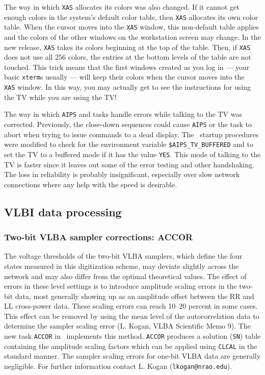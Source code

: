The way in which {\tt XAS} allocates its colors was also changed.  If
it cannot get enough colors in the system's default color table, then
{\tt XAS} allocates its own color table.  When the cursor moves into
the {\tt XAS} window, this non-default table applies and the colors of
the other windows on the workstation screen may change.  In the new
release, {\tt XAS} takes its colors beginning at the top of the table.
Then, if {\tt XAS} does not use all 256 colors, the entries at the
bottom levels of the table are not touched.  This trick means that the
first windows created as you log in --- your basic {\tt xterm}s
usually --- will keep their colors when the cursor moves into the {\tt
XAS} window.  In this way, you may actually get to see the
instructions for using the TV while you are using the \hbox{TV}!

\vfill\eject
The way in which {\tt AIPS} and tasks handle errors while talking to
the TV was corrected.  Previously, the close-down sequences could
cause {\tt AIPS} or the task to abort when trying to issue commands to
a dead display.  The \AIPS\ startup procedures were modified to check
for the environment variable {\tt \$AIPS\_TV\_BUFFERED} and to set the
TV to a buffered mode if it has the value \hbox{{\tt YES}}.  This mode
of talking to the TV is faster since it leaves out some of the error
testing and other handshaking.  The loss in reliability is probably
insignificant, especially over slow network connections where any help
with the speed is desirable.

\subsection{VLBI data processing}

\subsubsection{Two-bit VLBA sampler corrections: ACCOR}

The voltage thresholds of the two-bit VLBA samplers, which define the
four states measured in this digitization scheme, may deviate slightly
across the network and may also differ from the optimal theoretical
values. The effect of errors in these level settings is to introduce
amplitude scaling errors in the two-bit data, most generally showing
up as an amplitude offset between the RR and LL cross-power data.
These scaling errors can reach 10--20 percent in some cases. This
effect can be removed by using the mean level of the autocorrelation
data to determine the sampler scaling error (L. Kogan, VLBA Scientific
Memo 9).  The new task {\tt ACCOR} in \AIPS\ implements this method.
{\tt ACCOR} produces a solution ({\tt SN}) table containing the
amplitude scaling factors which can be applied using {\tt CLCAL} in
the standard manner. The sampler scaling errors for one-bit VLBA data
are generally negligible.  For further information contact L. Kogan
({\tt lkogan@nrao.edu}).

